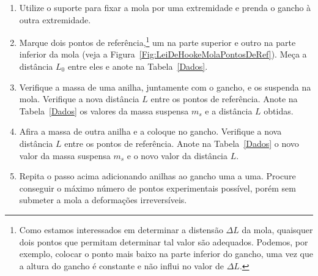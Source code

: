\begin{enumerate}
	\item Utilize o suporte para fixar a mola por uma extremidade e prenda o gancho à outra extremidade.
	\item Marque dois pontos de referência,\footnote[][1cm]{Como estamos interessados em determinar a distensão $\Delta L$ da mola, quaisquer dois pontos que permitam determinar tal valor são adequados. Podemos, por exemplo, colocar o ponto mais baixo na parte inferior do gancho, uma vez que a altura do gancho é constante e não influi no valor de $\Delta L$.}  um na parte superior e outro na parte inferior da mola (veja a Figura~\ref{Fig:LeiDeHookeMolaPontosDeRef}). Meça a distância $L_0$ entre eles e anote na Tabela~\ref{Dados}.
	\item Verifique a massa de uma anilha, juntamente com o gancho, e os suspenda na mola. Verifique a nova distância $L$ entre os pontos de referência. Anote  na Tabela~\ref{Dados} os valores da massa suspensa $m_s$ e a distância $L$ obtidas.
	\item Afira a massa de outra anilha e a coloque no gancho. Verifique a nova distância $L$ entre os pontos de referência. Anote na Tabela~\ref{Dados} o novo valor da massa suspensa $m_s$ e o novo valor da distância $L$.
	\item Repita o passo acima adicionando anilhas ao gancho uma a uma. Procure conseguir o máximo número de pontos experimentais possível, porém sem submeter a mola a deformações irreversíveis.
\end{enumerate}

\cleardoublepage


\vspace{15mm}

\begin{fullwidth}
\noindent{}
\vspace{5mm}

\noindent{}

\noindent{}

\noindent{}

\noindent{}

\noindent{}
\end{fullwidth}

